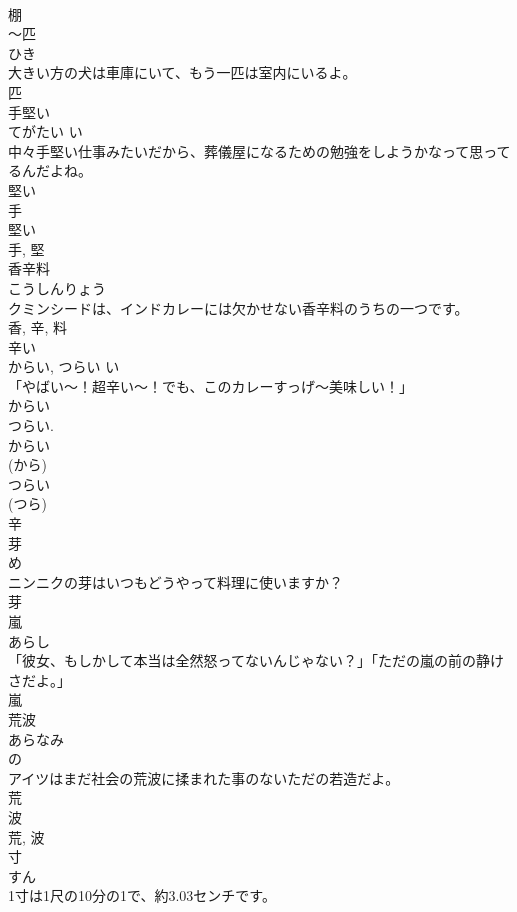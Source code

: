 \documentclass[8pt]{extreport}
\begin{document}
\begin{CJK}{UTF8}{min}
\\	棚	
\\	〜匹	
\\	ひき	
\\	大きい方の犬は車庫にいて、もう一匹は室内にいるよ。	
\\	匹	
\\	手堅い	
\\	てがたい	い 
\\	中々手堅い仕事みたいだから、葬儀屋になるための勉強をしようかなって思ってるんだよね。	
\\	堅い 
\\	手 
\\	堅い 
\\	手, 堅	
\\	香辛料	
\\	こうしんりょう	
\\	クミンシードは、インドカレーには欠かせない香辛料のうちの一つです。	
\\	香, 辛, 料	
\\	辛い	
\\	からい, つらい	い 
\\	「やばい〜！超辛い～！でも、このカレーすっげ〜美味しい！」	
\\	からい 
\\	つらい. 
\\	からい 
\\	(から) 
\\	つらい 
\\	(つら) 
\\	辛	
\\	芽	
\\	め	
\\	ニンニクの芽はいつもどうやって料理に使いますか？	
\\	芽	
\\	嵐	
\\	あらし	
\\	「彼女、もしかして本当は全然怒ってないんじゃない？」「ただの嵐の前の静けさだよ。」	
\\	嵐	
\\	荒波	
\\	あらなみ	
\\	の 
\\	アイツはまだ社会の荒波に揉まれた事のないただの若造だよ。	
\\	荒 
\\	波 
\\	荒, 波	
\\	寸	
\\	すん	
\\	1寸は1尺の10分の1で、約3.03センチです。	

\end{CJK}
\end{document}
